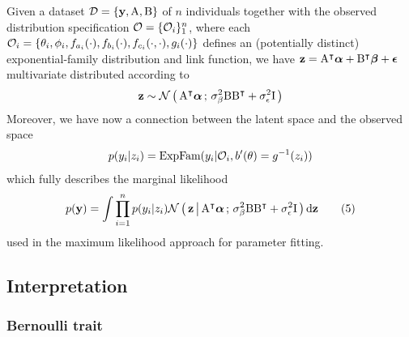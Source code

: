 Given a dataset $\mathcal{D} = \{\mathbf y, \mathrm A, \mathrm B\}$ of $n$
individuals together with the observed distribution specification
$\mathcal{O}=\{\mathcal{O}_i\}_1^n$, where each
$\mathcal{O}_i = \{\theta_i, \phi_i, f_{a_i}(\cdot), f_{b_i}(\cdot), f_{c_i}(\cdot, \cdot), g_i(\cdot)\}$
defines an (potentially distinct) exponential-family distribution and link
function, we have
$\mathbf z = \mathrm A^\intercal\boldsymbol\alpha + \mathrm B^\intercal\boldsymbol\beta + \boldsymbol\epsilon$
multivariate distributed according to
\begin{align*}
  \mathbf z \sim \mathcal{N}\left(\, {\mathrm A^\intercal \boldsymbol\alpha} \,;\, {\sigma^2_{\beta} \mathrm B\mathrm
	B^\intercal + \sigma^2_{\epsilon} \mathrm I} \,\right)
\end{align*}
Moreover, we have now a connection between the latent space and the observed space
\begin{align*}
  p(y_i | z_i) = \text{ExpFam} ({y_i | \mathcal{O}_i, b'(\theta)=g^{-1}(z_i)})
\end{align*}
which fully describes the marginal likelihood
\begin{align}\label{eq:ml}
  p(\mathbf y) = \int \prod_{i=1}^n p(y_i|z_i) \mathcal{N}\left(\, { {\mathbf z} \, \big| \, {\mathrm A^\intercal
	\boldsymbol\alpha} } \,;\, { {\sigma^2_{\beta} \mathrm B\mathrm B^\intercal + \sigma^2_{\epsilon}
	\mathrm I} } \,\right) \mathrm d \mathbf z \tag{5}
\end{align}
used in the maximum likelihood approach for parameter fitting.

\subsection{Interpretation}

\subsubsection{Bernoulli trait}

